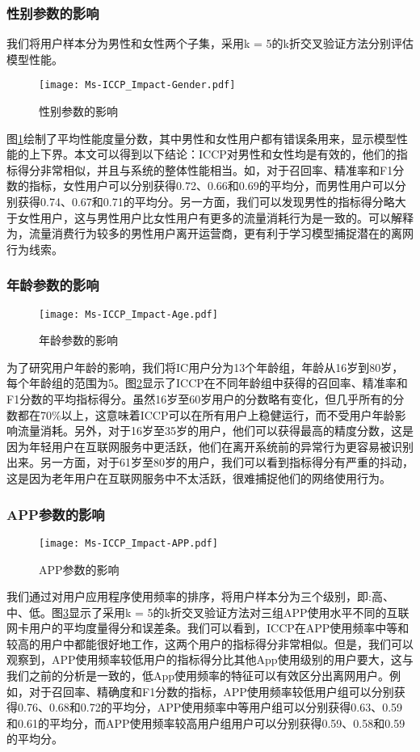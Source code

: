 \subsubsection{性别参数的影响}
我们将用户样本分为男性和女性两个子集，采用k = 5的k折交叉验证方法分别评估模型性能。
\begin{figure}[hbt]
	\centering
	\texttt{[image: Ms-ICCP\_Impact-Gender.pdf]}
	\caption{性别参数的影响}
	\label{Fig:Ms-ICCP_Impact-Gender}
\end{figure}
图\ref{Fig:Ms-ICCP_Impact-Gender}绘制了平均性能度量分数，其中男性和女性用户都有错误条用来，显示模型性能的上下界。本文可以得到以下结论：ICCP对男性和女性均是有效的，他们的指标得分非常相似，并且与系统的整体性能相当。如，对于召回率、精准率和F1分数的指标，女性用户可以分别获得0.72、0.66和0.69的平均分，而男性用户可以分别获得0.74、0.67和0.71的平均分。另一方面，我们可以发现男性的指标得分略大于女性用户，这与男性用户比女性用户有更多的流量消耗行为是一致的。可以解释为，流量消费行为较多的男性用户离开运营商，更有利于学习模型捕捉潜在的离网行为线索。
\subsubsection{年龄参数的影响}
\begin{figure}[hbt]
	\centering
	\texttt{[image: Ms-ICCP\_Impact-Age.pdf]}
	\caption{年龄参数的影响}
	\label{Fig:Impact-Age}
\end{figure}
为了研究用户年龄的影响，我们将IC用户分为13个年龄组，年龄从16岁到80岁，每个年龄组的范围为5。图\ref{Fig:Impact-Age}显示了ICCP在不同年龄组中获得的召回率、精准率和F1分数的平均指标得分。虽然16岁至60岁用户的分数略有变化，但几乎所有的分数都在70\%以上，这意味着ICCP可以在所有用户上稳健运行，而不受用户年龄影响流量消耗。另外，对于16岁至35岁的用户，他们可以获得最高的精度分数，这是因为年轻用户在互联网服务中更活跃，他们在离开系统前的异常行为更容易被识别出来。另一方面，对于61岁至80岁的用户，我们可以看到指标得分有严重的抖动，这是因为老年用户在互联网服务中不太活跃，很难捕捉他们的网络使用行为。

\subsubsection{APP参数的影响}
\begin{figure}[hbt]
	\centering
	\texttt{[image: Ms-ICCP\_Impact-APP.pdf]}
	\caption{APP参数的影响}
	\label{Fig:Impact-APP}
\end{figure}
我们通过对用户应用程序使用频率的排序，将用户样本分为三个级别，即:高、中、低。图\ref{Fig:Impact-APP}显示了采用k = 5的k折交叉验证方法对三组APP使用水平不同的互联网卡用户的平均度量得分和误差条。我们可以看到，ICCP在APP使用频率中等和较高的用户中都能很好地工作，这两个用户的指标得分非常相似。但是，我们可以观察到，APP使用频率较低用户的指标得分比其他App使用级别的用户要大，这与我们之前的分析是一致的，低App使用频率的特征可以有效区分出离网用户。例如，对于召回率、精确度和F1分数的指标，APP使用频率较低用户组可以分别获得0.76、0.68和0.72的平均分，APP使用频率中等用户组可以分别获得0.63、0.59和0.61的平均分，而APP使用频率较高用户组用户可以分别获得0.59、0.58和0.59的平均分。

